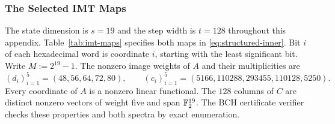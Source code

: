 \subsubsection{The Selected IMT Maps}

The state dimension is $s=19$ and the step width is $t=128$ throughout this
appendix. Table~\ref{tab:imt-maps} specifies both maps in
\eqref{eq:structured-inner}. Bit $i$ of each hexadecimal word is coordinate
$i$, starting with the least significant bit. Write $M:=2^{19}-1$.
The nonzero image weights of $A$ and their multiplicities are
\[
 (d_i)_{i=1}^5=(48,56,64,72,80),\qquad
 (c_i)_{i=1}^5=(5166,110288,293455,110128,5250).
\]
Every coordinate of $A$ is a nonzero linear functional. The $128$ columns
of $C$ are distinct nonzero vectors of weight five and span $\mathbb F_2^{19}$.
The BCH certificate verifier checks these properties and both spectra
by exact enumeration\repositorycite.

